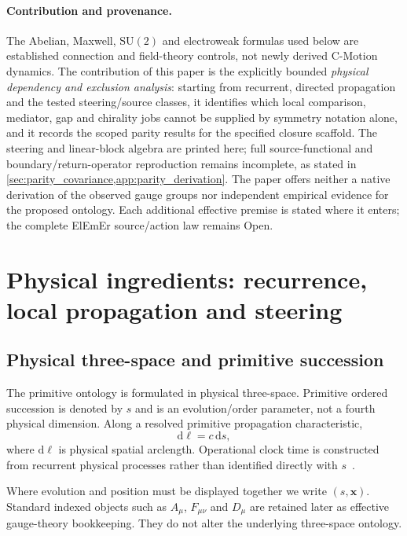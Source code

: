 \documentclass[11pt]{article}
\theoremstyle{definition}
\newcommand{\dd}{\mathrm{d}}
\newcommand{\SUtwo}{\mathrm{SU}(2)}
\begin{document}
\paragraph{Contribution and provenance.}
The Abelian, Maxwell, $\SUtwo$ and electroweak formulas used below are established
connection and field-theory controls, not newly derived C-Motion dynamics.  The
contribution of this paper is the explicitly bounded \emph{physical dependency and
exclusion analysis}: starting from recurrent, directed propagation and the tested
steering/source classes, it identifies which local comparison, mediator, gap and
chirality jobs cannot be supplied by symmetry notation alone, and it records the
scoped parity results for the specified closure scaffold.  The steering and
linear-block algebra are printed here; full source-functional and
boundary/return-operator reproduction remains incomplete, as stated in
\cref{sec:parity_covariance,app:parity_derivation}.  The paper offers
neither a native derivation of the observed gauge groups nor independent empirical
evidence for the proposed ontology.  Each additional effective premise is stated
where it enters; the complete ElEmEr source/action law remains Open.


\section{Physical ingredients: recurrence, local propagation and steering}
\label{sec:physical_ingredients}

\subsection{Physical three-space and primitive succession}

The primitive ontology is formulated in physical three-space.  Primitive ordered succession is denoted by $s$ and is an evolution/order parameter, not a fourth physical dimension.  Along a resolved primitive propagation characteristic,
\begin{equation}
  \dd\ell=c\,\dd s,
  \label{eq:local_c_succession}
\end{equation}
where $\dd\ell$ is physical spatial arclength.  Operational clock time is constructed from recurrent physical processes rather than identified directly with $s$~\cite{CmotionMainFramework2026}.

Where evolution and position must be displayed together we write $(s,\mathbf x)$.  Standard indexed objects such as $A_\mu$, $F_{\mu\nu}$ and $D_\mu$ are retained later as effective gauge-theory bookkeeping.  They do not alter the underlying three-space ontology.
\end{document}
